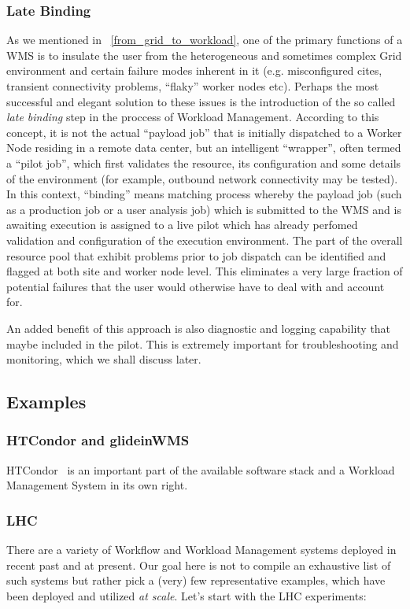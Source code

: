 \subsubsection{Late Binding}
As we mentioned in ~\ref{from_grid_to_workload}, one of the primary functions of a WMS is to insulate the user from the heterogeneous and sometimes complex
Grid environment and certain failure modes inherent in it (e.g. misconfigured cites, transient connectivity problems, ``flaky'' worker nodes etc).
Perhaps the most successful and elegant solution to these issues is the introduction of the so called \textit{late binding} step in
the proccess of Workload Management. According to this concept, it is not the actual ``payload job'' that is initially dispatched to a  Worker Node residing in a
remote data center, but an intelligent ``wrapper'', often termed a ``pilot job'', which first validates the resource, its configuration and some details of the environment
(for example, outbound network connectivity may be tested). In this context, ``binding'' means matching process whereby the payload job (such as a production job or
a user analysis job) which is submitted to the WMS and is awaiting execution is assigned to a live pilot which has already perfomed validation and configuration of
the execution environment. The part of the overall resource pool that exhibit problems prior to job dispatch can be identified and flagged at both site and worker node
level. This eliminates a very large fraction of potential failures that the user would otherwise have to deal with and account for.

An added benefit of this approach is also diagnostic and logging capability that maybe included
in the pilot. This is extremely important for troubleshooting and monitoring, which we shall discuss later.


\subsection{Examples}
\label{wms_examples}
\subsubsection{HTCondor and glideinWMS}
HTCondor~\cite{htcondor} is an important part of the available software stack and a Workload Management System in its own right.

\subsubsection{LHC}
There are a variety of Workflow and Workload Management systems deployed in recent past and at present. Our goal here is not to compile an exhaustive list of such systems but rather pick a (very) few representative examples, which have been deployed and utilized \textit{at scale}.
Let's start with the LHC experiments:

